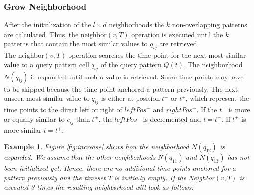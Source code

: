 \documentclass[abstracton,12pt]{scrreprt}
\newtheorem{example}{Example}
\begin{document}
\subsubsection{Grow Neighborhood}
After the initialization of the $l \times d$ neighborhoods the $k$ non-overlapping patterns are calculated. Thus, the neighbor$(v, T)$ operation is executed until the $k$ patterns that contain the most similar values to $q_{ij}$ are retrieved.\\
The neighbor$(v, T)$ operation searches the time point for the next most similar value to a query pattern cell $q_{ij}$ of the query pattern $Q(t)$. The neighborhood $N(q_{ij})$ is expanded until such a value is retrieved. Some time points may have to be skipped because the time point anchored a pattern previously. The next unseen most similar value to $q_{ij}$ is either at position $t^-$ or $t^+$, which represent the time points to the direct left or right of $leftPos^-$ and $rightPos^+$. If the $t^-$ is more or equally similar to $q_{ij}$ than $t^+$, the $leftPos^-$ is decremented and $t=t^-$. If $t^+$ is more similar $t=t^+$.

\begin{example}
Figure \ref{fig:increase} shows how the neighborhood $N(q_{12})$ is expanded. We assume that the other neighborhoods $N(q_{11})$ and $N(q_{13})$ has not been initialized yet. 
Hence, there are no additional time points anchored for a pattern previously and the timeset $T$ is initially empty. If the Neighbor$(v,T)$ is executed 3 times the resulting neighborhood will look as follows:  
\end{example}
\end{document}
